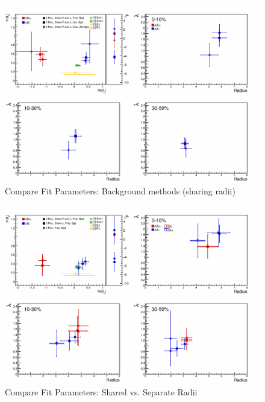 \documentclass[../AnalysisNoteJBuxton.tex]{subfiles}
\begin{document}
\begin{figure}[h]
  \centering
  \includegraphics[width=\textwidth]{7_ResultsAndDiscussion/Figures/CompareAllScattParams_ShareR_Sharelam.pdf}
  \caption[Compare Fit Parameters: Background methods (sharing radii)]{Compare Fit Parameters: Background methods (sharing radii)}
  \label{fig:CompareAllScattParams_ShareR_Sharelam}
\end{figure}

\begin{figure}[h]
  \centering
  \includegraphics[width=\textwidth]{7_ResultsAndDiscussion/Figures/CompareAllScattParams_SharevsSepR.pdf}
  \caption[Compare Fit Parameters: Shared vs. Separate Radii]{Compare Fit Parameters: Shared vs. Separate Radii}
  \label{fig:CompareAllScattParams_SharevsSepR}
\end{figure}
\end{document}
